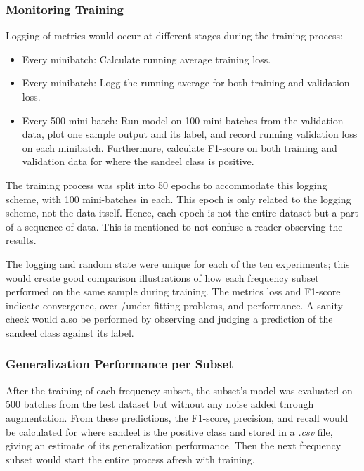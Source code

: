         \subsubsection{Monitoring Training}
        Logging of metrics would occur at different stages during the training process;
            \begin{itemize}
                \item Every minibatch: Calculate running average training loss.
                \item Every minibatch: Logg the running average for both training and validation loss.
                \item Every 500 mini-batch: Run model on 100 mini-batches from the validation data, plot one sample output and its label, and record running validation loss on each minibatch. Furthermore, calculate F1-score on both training and validation data for where the sandeel class is positive.
            \end{itemize}
            
        The training process was split into 50 epochs to accommodate this logging scheme, with 100 mini-batches in each. This epoch is only related to the logging scheme, not the data itself. Hence, each epoch is not the entire dataset but a part of a sequence of data. This is mentioned to not confuse a reader observing the results.
    
        The logging and random state were unique for each of the ten experiments; this would create good comparison illustrations of how each frequency subset performed on the same sample during training.  The metrics loss and F1-score indicate convergence, over-/under-fitting problems, and performance. A sanity check would also be performed by observing and judging a prediction of the sandeel class against its label.
        
        \subsubsection{Generalization Performance per Subset}
        After the training of each frequency subset, the subset’s model was evaluated on 500 batches from the test dataset but without any noise added through augmentation. From these predictions, the F1-score, precision, and recall would be calculated for where sandeel is the positive class and stored in a \textit{.csv} file, giving an estimate of its generalization performance. Then the next frequency subset would start the entire process afresh with training.
        
